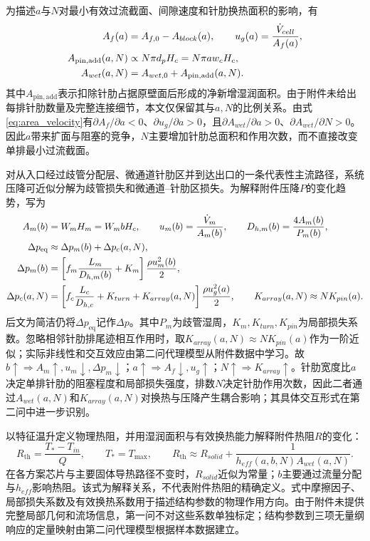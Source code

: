 \documentclass[UTF8,12pt,a4paper]{ctexart}
\newcommand{\Rth}{R_{\mathrm{th}}}\newcommand{\dP}{\Delta p}
\begin{document}
为描述$a$与$N$对最小有效过流截面、间隙速度和针肋换热面积的影响，有
\begin{align}
A_f(a)&=A_{f,0}-A_{block}(a),\qquad u_g(a)=\frac{\dot V_{cell}}{A_f(a)},\notag\\
A_{\mathrm{pin,add}}(a,N)&\propto N\pi d_pH_c=N\pi aw_cH_c,\notag\\
A_{wet}(a,N)&=A_{wet,0}+A_{\mathrm{pin,add}}(a,N).
\label{eq:area_velocity}
\end{align}
其中$A_{\mathrm{pin,add}}$表示扣除针肋占据原壁面后形成的净新增湿润面积。由于附件未给出每排针肋数量及完整连接细节，本文仅保留其与$a,N$的比例关系。由式\eqref{eq:area_velocity}有$\partial A_f/\partial a<0$、$\partial u_g/\partial a>0$，且$\partial A_{wet}/\partial a>0$、$\partial A_{wet}/\partial N>0$。因此$a$带来扩面与阻塞的竞争，$N$主要增加针肋总面积和作用次数，而不直接改变单排最小过流截面。

对从入口经过歧管分配层、微通道针肋区并到达出口的一条代表性主流路径，系统压降可近似分解为歧管损失和微通道--针肋区损失。为解释附件压降$P$的变化趋势，写为
\begin{align}
A_m(b)&=W_mH_m=W_mbH_c,\qquad u_m(b)=\frac{\Vdot_m}{A_m(b)},\qquad D_{h,m}(b)=\frac{4A_m(b)}{P_m(b)},\notag\\
\Delta p_{\mathrm{eq}}&\approx\dP_m(b)+\dP_c(a,N),\notag\\
\dP_m(b)&=\left[f_m\frac{L_m}{D_{h,m}(b)}+K_m\right]\frac{\rho u_m^2(b)}{2},\notag\\
\dP_c(a,N)&=\left[f_c\frac{L_c}{D_{h,c}}+K_{turn}+K_{array}(a,N)\right]\frac{\rho u_g^2(a)}{2},\qquad
K_{array}(a,N)\approx NK_{pin}(a).
\label{eq:pressure}
\end{align}
后文为简洁仍将$\Delta p_{\mathrm{eq}}$记作$\dP$。其中$P_m$为歧管湿周，$K_m,K_{turn},K_{pin}$为局部损失系数。忽略相邻针肋排尾迹相互作用时，取$K_{array}(a,N)\approx NK_{pin}(a)$作为一阶近似；实际非线性和交互效应由第二问代理模型从附件数据中学习。故$b\uparrow\Rightarrow A_m\uparrow,u_m\downarrow,\Delta p_m\downarrow$；$a\uparrow\Rightarrow A_f\downarrow,u_g\uparrow$；$N\uparrow\Rightarrow K_{array}\uparrow$。针肋宽度比$a$决定单排针肋的阻塞程度和局部损失强度，排数$N$决定针肋作用次数，因此二者通过$A_{wet}(a,N)$和$K_{array}(a,N)$对换热与压降产生耦合影响；其具体交互形式在第二问中进一步识别。

以特征温升定义物理热阻，并用湿润面积与有效换热能力解释附件热阻$R$的变化：
\begin{equation}
\Rth=\frac{T_\ast-T_{in}}{Q},\qquad T_\ast=T_{\max},\qquad
\Rth\approx R_{solid}+\frac{1}{h_{eff}(a,b,N)A_{wet}(a,N)}.
\label{eq:thermal}
\end{equation}
在各方案芯片与主要固体导热路径不变时，$R_{solid}$近似为常量；$b$主要通过流量分配与$h_{eff}$影响热阻。该式为解释关系，不代表附件热阻的精确定义。式中摩擦因子、局部损失系数及有效换热系数用于描述结构参数的物理作用方向。由于附件未提供完整局部几何和流场信息，第一问不对这些系数单独标定；结构参数到三项无量纲响应的定量映射由第二问代理模型根据样本数据建立。
\end{document}
